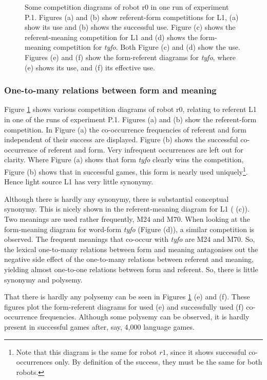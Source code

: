 \begin{figure}
\caption{Some competition diagrams of robot r0 in one run of experiment P.1. Figures (a) and (b) show referent-form competitions for L1, (a) show its use and (b) shows the successful use. Figure (c) shows the referent-meaning competition for L1 and (d) shows the form-meaning competition for {\it tyfo}. Both Figure (c) and (d) show the use. Figures (e) and (f) show the form-referent diagrams for {\it tyfo}, where (e) shows its use, and (f) its effective use.}
\label{f:opt:ggcomp1}
\end{figure}

\subsubsection{One-to-many relations between form and meaning}

Figure \ref{f:opt:ggcomp1} shows various competition diagrams of robot r0, relating to referent L1 in one of the runs of experiment P.1. Figures (a) and (b) show the referent-form competition. In Figure (a) the co-occurrence frequencies of referent and form independent of their success are displayed. Figure (b) shows the successful co-occurrence of referent and form. Very infrequent occurrences are left out for clarity. Where Figure (a) shows that form {\it tyfo} clearly wins the competition, Figure (b) shows that  in successful games, this form is nearly used uniquely\footnote{Note that this diagram is the same for robot $r1$, since it shows successful co-occurrences only. By definition of the success, they must be the same for both robots.}. Hence light source L1 has very little synonymy. 

Although there is hardly any synonymy, there is substantial conceptual synonymy. This is nicely shown in the referent-meaning diagram for L1 ( (c)). Two meanings are used rather frequently, M24 and M70. When looking at the form-meaning diagram for word-form {\it tyfo} (Figure (d)), a similar competition is observed. The frequent meanings that co-occur with {\it tyfo} are M24 and M70. So, the lexical one-to-many relations between form and meaning antagonises out the negative side effect of the one-to-many relations between referent and meaning, yielding almost one-to-one relations between form and referent. So, there is little synonymy and polysemy. 

That there is hardly any polysemy can be seen in Figures \ref{f:opt:ggcomp1} (e) and (f). These figures plot the form-referent diagrams for used (e) and successfully used (f) co-occurrence frequencies. Although some polysemy can be observed, it is hardly present in successful games after, say, 4,000 language games.


